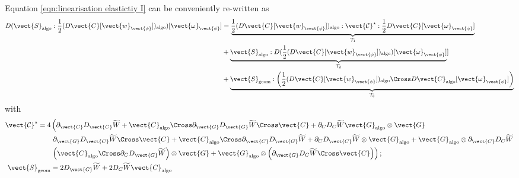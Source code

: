 Equation \eqref{eqn:linearisation elastictiy I} can be conveniently re-written as
%
\begin{equation}\label{eqn:linearisation elastictiy II}
\begin{aligned}
D(\vect{S}_{\text{algo}}:\frac{1}{2}(D\vect{C}[\vect{w}_{\vect{\phi}}])_{\text{algo}})[\vect{\omega}_{\vect{\phi}}]&=
\underbrace{\frac{1}{2}(D\vect{C}[\vect{w}_{\vect{\phi}}])_{\text{algo}}:\vect{\mathcal{C}}^{\star}:\frac{1}{2}D\vect{C}[\vect{\omega}_{\vect{\phi}}]}_{\mathcal{T}_1}\\&
%
+\underbrace{\vect{S}_{\text{algo}}:D(\frac{1}{2}(D\vect{C}[\vect{w}_{\vect{\phi}}])_{\text{algo}})[\vect{\omega}_{\vect{\phi}}]}_{\mathcal{T}_2}] \\&
%
+ \underbrace{\vect{S}_{\text{geom}}:\left(\frac{1}{2}(D\vect{C}[\vect{w}_{\vect{\phi}}])_{\text{algo}}\Cross D\vect{C}_{\text{algo}}[\vect{\omega}_{\vect{\phi}}]\right)}_{\mathcal{T}_3}
\end{aligned}
\end{equation}
%
with
%
\begin{equation}
\begin{aligned}
\vect{\mathcal{C}}^{\star}  = 4&\left(\partial_{\vect{C}}D_{\vect{C}}\widetilde{W}
%
 + \vect{C}_{\text{algo}}\Cross\partial_{\vect{G}}D_{\vect{G}}\widetilde{W}\Cross\vect{C} 
 +\partial_{{C}}D_{{C}}\widetilde{W}\vect{G}_{\text{algo}}\otimes\vect{G}\right.\\
 &\left.\partial_{\vect{G}}D_{\vect{C}}\widetilde{W}\Cross\vect{C} + \vect{C}_{\text{algo}}\Cross\partial_{\vect{C}}D_{\vect{G}}\widetilde{W} 
 +\partial_{{C}}D_{\vect{C}}\widetilde{W}\otimes\vect{G}_{\text{algo}}
 	+\vect{G}_{\text{algo}}\otimes\partial_{\vect{C}}D_{{C}}\widetilde{W}\right.\\
 	&\left.
 	\left(\vect{C}_{\text{algo}}\Cross\partial_{{C}}D_{\vect{G}}\widetilde{W}\right)\otimes\vect{G} + 
 	\vect{G}_{\text{algo}}\otimes\left(\partial_{\vect{G}}D_{{C}}\widetilde{W}\Cross\vect{C}\right)
\right);\\
%
\vect{S}_{\text{geom}}& = 2D_{\vect{G}}\widetilde{W} + 2D_C\widetilde{W}\vect{C}_{\text{algo}}
\end{aligned}
\end{equation}

